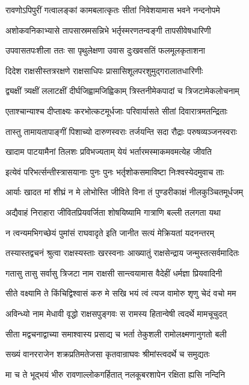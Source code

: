 \twolineshloka
{रावणोऽपिपुरीं गत्वालङ्कां कामबलात्कृतः}
{सीतां निवेशयामास भवने नन्दनोपमे}


\twolineshloka
{अशोकवनिकाभ्यासे तापसास्रमसन्निभे}
{भर्तृस्मरणतन्वङ्गी तापसीवेषधारिणी}


\twolineshloka
{उपवासतपःशीला ततः सा पृथुलेक्षणा}
{उवास दुःखवसतिं फलमूलकृताशना}


\twolineshloka
{दिदेश राक्षसीस्तत्ररक्षणे राक्षसाधिपः}
{प्रासासिशूलपरशुमुद्गरालातधारिणीः}


\twolineshloka
{द्व्यक्षीं त्र्यक्षीं ललाटक्षीं दीर्घजिह्वामजिह्विकाम्}
{त्रिस्तनीमेकपादां च त्रिजटामेकलोचनाम्}


\twolineshloka
{एताश्चान्याश्च दीप्ताक्ष्यः करभोत्कटमूर्धजाः}
{परिवार्यासते सीतां दिवारात्रमतन्द्रिताः}


\twolineshloka
{तास्तु तामायतापाङ्गीं पिशाच्यो दारुणस्वराः}
{तर्जयन्ति सदा रौद्राः परुषव्यञ्जनस्वराः}


\twolineshloka
{खादाम पाटयामैनां तिलशः प्रविभज्यताम्}
{येयं भर्तारमस्माकमवमत्येह जीवति}


\twolineshloka
{इत्येवं परिभर्त्सन्तीस्त्रासयानाः पुनः पुनः}
{भर्तृशोकसमाविष्टा निःश्वस्येदमुवाच ताः}


\twolineshloka
{आर्याः खादत मां शीघ्रं न मे लोभोस्ति जीविते}
{विना तं पुण्डरीकाक्षं नीलकुञ्चितमूर्धजम्}


\twolineshloka
{अद्यैवाहं निराहारा जीवितप्रियवर्जिता}
{शोषयिष्यामि गात्राणि बल्ली तलगता यथा}


\twolineshloka
{न त्वन्यमभिगच्छेयं पुमांसं राघवादृते}
{इति जानीत सत्यं मेक्रियतां यदनन्तरम्}


\twolineshloka
{तस्यास्तद्वचनं श्रुत्वा राक्षस्यस्ताः खरस्वनाः}
{आख्यातुं राक्षसेन्द्राय जन्मुस्तत्सर्वमादितः}


\twolineshloka
{गतासु तासु सर्वासु त्रिजटा नाम राक्षसी}
{सान्त्वयामास वैदेहीं धर्मज्ञा प्रियवादिनी}


\twolineshloka
{सीते वक्ष्यामि ते किंचिद्विश्वासं करु मे सखि}
{भयं त्वं त्यज वामोरु शृणु चेदं वचो मम}


\twolineshloka
{अविन्ध्यो नाम मेधावी वृद्धो राक्षसपुङ्गवः}
{स रामस्य हितान्वेषी त्वदर्थे मामचूचुदत्}


\twolineshloka
{सीता मद्वचनाद्वाच्या समाश्वास्य प्रसाद्य च}
{भर्ता तेकुशली रामोलक्ष्मणानुगतो बली}


\twolineshloka
{सख्यं वानरराजेन शक्रप्रतिमतेजसा}
{कृतवान्राघवः श्रीमांस्त्वदर्थे च समुद्यतः}


\twolineshloka
{मा च ते भूद्भयं भीरु रावणाल्लोकगर्हितात्}
{नलकूबरशापेन रक्षिता ह्यसि नन्दिनि}


